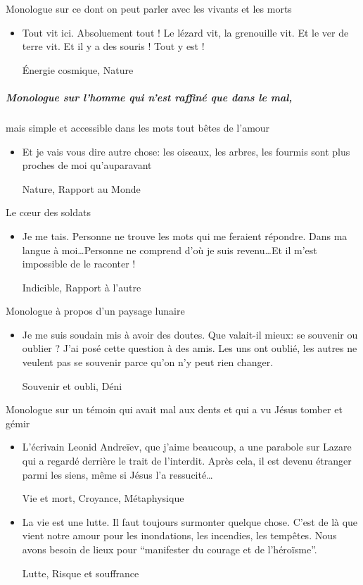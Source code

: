 \documentclass[french,a4paper,11pt,answers]{exam}
\newcommand{\cit}[2]{\og #1 \fg{} \begin{solution}{ #2 }\end{solution}} %
\begin{document}
    \begin{cadre}{Monologue sur ce dont on peut parler avec les vivants et les morts}
	\begin{itemize}
	    \item \cit {Tout vit ici. Absoluement tout ! Le lézard vit, la grenouille vit. Et le ver de terre vit. Et il y a des souris ! Tout y est !}
		{Énergie cosmique, Nature}
	\end{itemize}
    \end{cadre}

    \subparagraph{Monologue sur l'homme qui n'est raffiné que dans le mal{,}}
    \begin{cadre}{mais simple et accessible dans les mots tout bêtes de l'amour}
	\begin{itemize}
	    \item \cit {Et je vais vous dire autre chose: les oiseaux, les arbres, les fourmis sont plus proches de moi qu'auparavant}
		{Nature, Rapport au Monde}
	\end{itemize}
    \end{cadre}

    \begin{cadre}{Le c\oe{}ur des soldats}
	\begin{itemize}
	    \item \cit {Je me tais. Personne ne trouve les mots qui me feraient répondre. Dans ma langue à moi\ldots Personne ne comprend d'où je suis revenu\ldots Et il m'est impossible de le raconter !}
		{Indicible, Rapport à l'autre}
	\end{itemize}
    \end{cadre}

    \begin{cadre}{Monologue à propos d'un paysage lunaire}
	\begin{itemize}
	    \item \cit {Je me suis soudain mis à avoir des doutes. Que valait-il mieux: se souvenir ou oublier ? J'ai posé cette question à des amis. Les uns ont oublié, les autres ne veulent pas se souvenir parce qu'on n'y peut rien changer.}
		{Souvenir et oubli, Déni}
	\end{itemize}
    \end{cadre}

    \begin{cadre}{Monologue sur un témoin qui avait mal aux dents et qui a vu Jésus tomber et gémir}
	\begin{itemize}
	    \item \cit {L'écrivain Leonid Andreïev, que j'aime beaucoup, a une parabole sur Lazare qui a regardé derrière le trait de l'interdit. Après cela, il est devenu étranger parmi les siens, même si Jésus l'a ressucité\ldots}
		{Vie et mort, Croyance, Métaphysique}
	    \item \cit{La vie est une lutte. Il faut toujours surmonter quelque chose. C'est de là que vient notre amour pour les inondations, les incendies, les tempêtes. Nous avons besoin de lieux pour “manifester du courage et de l'héroïsme''.}
		{Lutte, Risque et souffrance}
	\end{itemize}
    \end{cadre}
\end{document}
